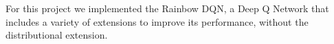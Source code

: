 
For this project we implemented the Rainbow DQN\cite{Hessel2018RainbowCI}, a Deep Q Network that includes a variety of extensions to improve its performance, without the distributional extension.

